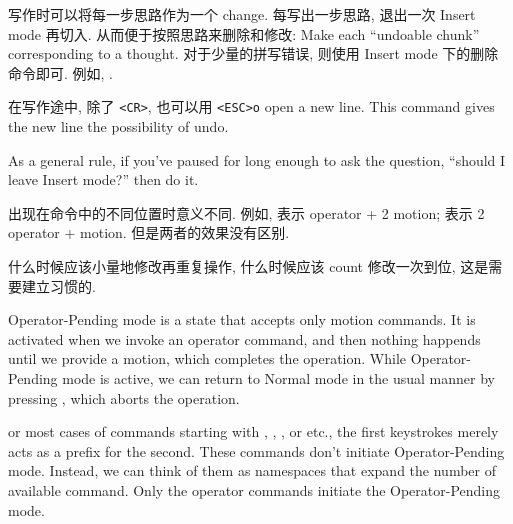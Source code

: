 写作时可以将每一步思路作为一个 change. 每写出一步思路, 退出一次 Insert mode 再切入. 从而便于按照思路来删除和修改:
Make each ``undoable chunk'' corresponding to a thought.
对于少量的拼写错误, 则使用 Insert mode 下的删除命令即可. 例如, .

在写作途中, 除了 \verb|<CR>|, 也可以用 \verb|<ESC>o| open a new line. This command gives the new line the possibility of undo.

As a general rule, if you've paused for long enough to ask the question, ``should I leave Insert mode?'' then do it.

\syntax{[count]} 出现在命令中的不同位置时意义不同. 例如,  表示  operator + 2  motion;  表示 2  operator +  motion. 但是两者的效果没有区别.

什么时候应该小量地修改再重复操作, 什么时候应该 count 修改一次到位, 这是需要建立习惯的.

Operator-Pending mode is a state that accepts only motion commands.
It is activated when we invoke an operator command, and then nothing happends until we provide a motion, which completes the operation.
While Operator-Pending mode is active, we can return to Normal mode in the usual manner by pressing , which aborts the operation.

or most cases of commands starting with , , , or \syntax{[}\vphantom{]} etc., the first keystrokes merely acts as a prefix for the second. These commands don't initiate Operator-Pending mode. Instead, we can think of them as namespaces that expand the number of available command. Only the operator commands initiate the Operator-Pending mode.


